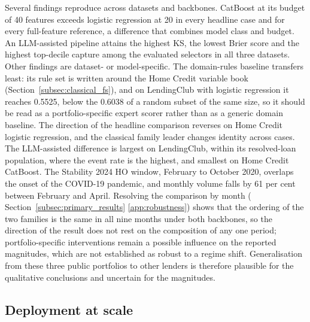 \documentclass[final,5p,twocolumn]{elsarticle}
\providecommand{\DIFaddtex}[1]{{\protect\color{blue} \sf #1}} %
\providecommand{\DIFdeltex}[1]{{\protect\color{red} \scriptsize #1}} %
\providecommand{\DIFaddbegin}{} %
\providecommand{\DIFaddend}{} %
\providecommand{\DIFdelbegin}{} %
\providecommand{\DIFdelend}{} %
\providecommand{\DIFadd}[1]{\texorpdfstring{\DIFaddtex{#1}}{#1}} %
\providecommand{\DIFdel}[1]{\texorpdfstring{\DIFdeltex{#1}}{}} %
\begin{document}
Several findings reproduce across datasets and backbones. CatBoost at its budget of 40 features exceeds logistic regression at 20 in every headline case and for every full-feature reference, a difference that combines model class and budget. An LLM-assisted pipeline attains the highest KS, the lowest Brier score and the highest top-decile capture among the evaluated selectors in all three datasets. Other findings are dataset- or model-specific. The domain-rules baseline transfers least: its rule set is written around the Home Credit variable book (Section~\ref{subsec:classical_fs}), and on LendingClub with logistic regression it reaches 0.5525, below the 0.6038 of a random subset of the same size, so it should be read as a portfolio-specific expert scorer rather than as a generic domain baseline. The direction of the headline comparison reverses on Home Credit logistic regression, and the classical family leader changes identity across cases. The LLM-assisted difference is largest on LendingClub, within its resolved-loan population, where the event rate is the highest, and smallest on Home Credit CatBoost. The Stability 2024 HO window, February to October 2020, overlaps the onset of the COVID-19 pandemic, and monthly volume falls by 61 per cent between February and April. Resolving the comparison by month (\DIFdelbegin \DIFdel{Section~\ref{subsec:primary_results}}\DIFdelend \DIFaddbegin \DIFadd{\ref{app:robustness}}\DIFaddend ) shows that the ordering of the two families is the same in all nine months under both backbones, so the direction of the result does not rest on the composition of any one period; portfolio-specific interventions remain a possible influence on the reported magnitudes, which are not established as robust to a regime shift. Generalisation from these three public portfolios to other lenders is therefore plausible for the qualitative conclusions and uncertain for the magnitudes.

\DIFaddbegin \subsection{\DIFadd{Deployment at scale}}
\label{subsec:deployment_scale}
\end{document}
